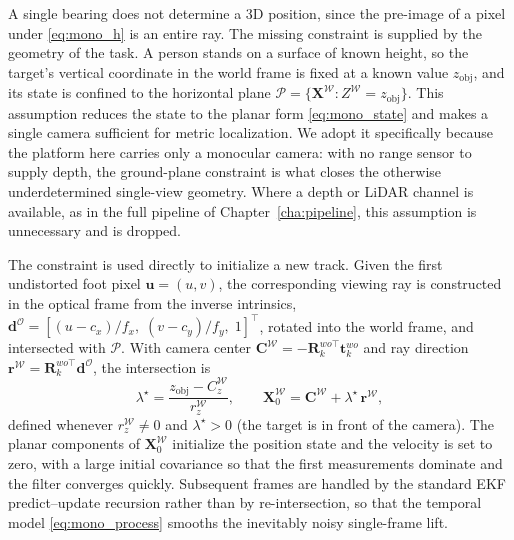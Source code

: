 A single bearing does not determine a 3D position, since the pre-image of a pixel
under \eqref{eq:mono_h} is an entire ray. The missing constraint is supplied by
the geometry of the task. A person stands on a surface of known height, so the
target's vertical coordinate in the world frame is fixed at a known value
$z_{\mathrm{obj}}$, and its state is confined to the horizontal plane
$\mathcal{P}=\{\bm{X}^{\mathcal{W}}: Z^{\mathcal{W}}=z_{\mathrm{obj}}\}$. This
assumption reduces the state to the planar form \eqref{eq:mono_state}
and makes a single camera sufficient for metric localization. We adopt it
specifically because the platform here carries only a monocular camera: with no
range sensor to supply depth, the ground-plane constraint is what closes the
otherwise underdetermined single-view geometry. Where a depth or LiDAR channel is
available, as in the full pipeline of Chapter~\ref{cha:pipeline}, this assumption
is unnecessary and is dropped.

The constraint is used directly to initialize a new track. Given the first
undistorted foot pixel $\bm{u}=(u,v)$, the corresponding viewing ray is
constructed in the optical frame from the inverse intrinsics,
$\bm{d}^{\mathcal{O}}=[(u-c_x)/f_x,\;(v-c_y)/f_y,\;1]^{\top}$, rotated into the
world frame, and intersected with $\mathcal{P}$. With camera center
$\bm{C}^{\mathcal{W}}=-\bm{R}^{wo\top}_k\bm{t}^{wo}_k$ and ray direction
$\bm{r}^{\mathcal{W}}=\bm{R}^{wo\top}_k\bm{d}^{\mathcal{O}}$, the intersection is
\begin{equation}
  \lambda^\star = \frac{z_{\mathrm{obj}} - C^{\mathcal{W}}_z}{r^{\mathcal{W}}_z},
  \qquad
  \bm{X}^{\mathcal{W}}_0 = \bm{C}^{\mathcal{W}} + \lambda^\star\,\bm{r}^{\mathcal{W}},
  \label{eq:rayplane}
\end{equation}
defined whenever $r^{\mathcal{W}}_z\neq 0$ and $\lambda^\star>0$ (the target is in
front of the camera). The planar components of $\bm{X}^{\mathcal{W}}_0$ initialize
the position state and the velocity is set to zero, with a large initial
covariance so that the first measurements dominate and the filter converges
quickly. Subsequent frames are handled by the standard EKF predict--update
recursion rather than by re-intersection, so that the temporal model
\eqref{eq:mono_process} smooths the inevitably noisy single-frame lift.

